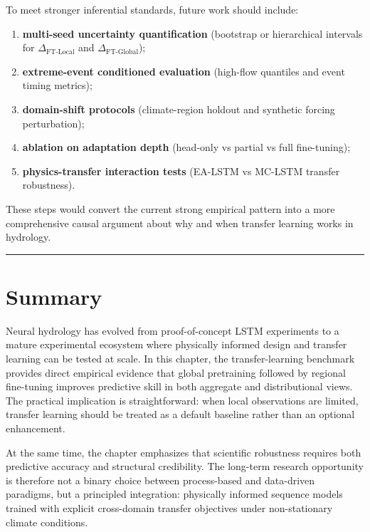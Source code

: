 \documentclass[
]{krantz}
\providecommand{\tightlist}{%
  \setlength{\itemsep}{0pt}\setlength{\parskip}{0pt}}
\begin{document}
To meet stronger inferential standards, future work should include:

\begin{enumerate}
\def\labelenumi{\arabic{enumi}.}
\tightlist
\item
  \textbf{multi-seed uncertainty quantification} (bootstrap or hierarchical intervals for
  \(\Delta_{\text{FT-Local}}\) and \(\Delta_{\text{FT-Global}}\));
\item
  \textbf{extreme-event conditioned evaluation} (high-flow quantiles and event timing
  metrics);
\item
  \textbf{domain-shift protocols} (climate-region holdout and synthetic forcing perturbation);
\item
  \textbf{ablation on adaptation depth} (head-only vs partial vs full fine-tuning);
\item
  \textbf{physics-transfer interaction tests} (EA-LSTM vs MC-LSTM transfer robustness).
\end{enumerate}

These steps would convert the current strong empirical pattern into a more comprehensive
causal argument about why and when transfer learning works in hydrology.

\begin{center}\rule{0.5\linewidth}{0.5pt}\end{center}

\section{Summary}\label{nh-summary}

Neural hydrology has evolved from proof-of-concept LSTM experiments to a mature
experimental ecosystem where physically informed design and transfer learning can be
tested at scale. In this chapter, the transfer-learning benchmark provides direct empirical evidence
that global pretraining followed by regional fine-tuning improves predictive skill in
both aggregate and distributional views. The practical implication is straightforward:
when local observations are limited, transfer learning should be treated as a default
baseline rather than an optional enhancement.

At the same time, the chapter emphasizes that scientific robustness requires both
predictive accuracy and structural credibility. The long-term research opportunity is
therefore not a binary choice between process-based and data-driven paradigms, but a
principled integration: physically informed sequence models trained with explicit
cross-domain transfer objectives under non-stationary climate conditions.
\end{document}
